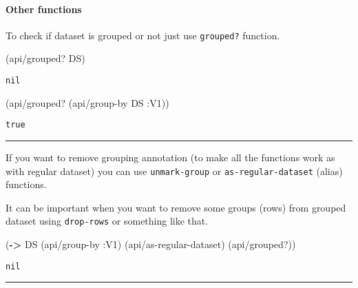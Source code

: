 \documentclass[]{article}
\newenvironment{Shaded}{\begin{snugshade}}{\end{snugshade}}
\newcommand{\KeywordTok}[1]{\textcolor[rgb]{0.13,0.29,0.53}{\textbf{#1}}}
\newcommand{\AttributeTok}[1]{\textcolor[rgb]{0.77,0.63,0.00}{#1}}
\newcommand{\NormalTok}[1]{#1}
\let\oldparagraph\paragraph
\renewcommand{\paragraph}[1]{\oldparagraph{#1}\mbox{}}
\begin{document}
\paragraph{Other functions}\label{other-functions}

To check if dataset is grouped or not just use \texttt{grouped?}
function.

\begin{Shaded}
\begin{Highlighting}[]
\NormalTok{(api/grouped? DS)}
\end{Highlighting}
\end{Shaded}

\begin{verbatim}
nil
\end{verbatim}

\begin{Shaded}
\begin{Highlighting}[]
\NormalTok{(api/grouped? (api/group-by DS }\AttributeTok{:V1}\NormalTok{))}
\end{Highlighting}
\end{Shaded}

\begin{verbatim}
true
\end{verbatim}

\begin{center}\rule{0.5\linewidth}{0.5pt}\end{center}

If you want to remove grouping annotation (to make all the functions
work as with regular dataset) you can use \texttt{unmark-group} or
\texttt{as-regular-dataset} (alias) functions.

It can be important when you want to remove some groups (rows) from
grouped dataset using \texttt{drop-rows} or something like that.

\begin{Shaded}
\begin{Highlighting}[]
\NormalTok{(}\KeywordTok{->}\NormalTok{ DS}
\NormalTok{    (api/group-by }\AttributeTok{:V1}\NormalTok{)}
\NormalTok{    (api/as-regular-dataset)}
\NormalTok{    (api/grouped?))}
\end{Highlighting}
\end{Shaded}

\begin{verbatim}
nil
\end{verbatim}

\begin{center}\rule{0.5\linewidth}{0.5pt}\end{center}
\end{document}
